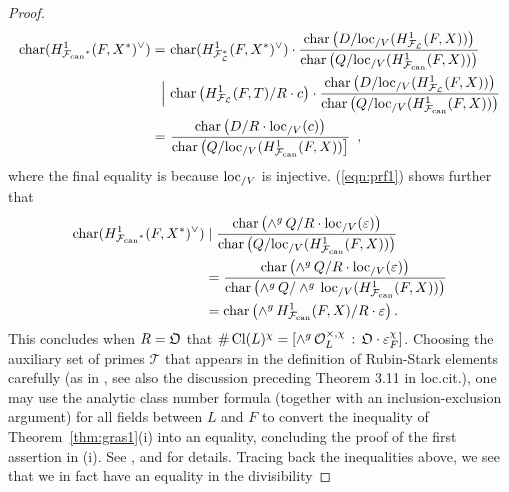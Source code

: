 \documentclass[12pt]{amsart}
\numberwithin{equation}{section}
\begin{document}
\begin{proof}
\begin{align}\notag{\textup{char}}(H^1_{{\mathcal{F}_{\textup{\lowercase{can}}}}^*}(F,X^*)^\vee)=&\,\,{\textup{char}} (H^1_{{\mathcal{F}}_{\mathcal{L}}^*}(F,X^*)^\vee)\cdot\frac{{\textup{char}}\left(D/{{\textup{loc}_{/V}}(H^1_{{\mathcal{F}}_{\mathcal{L}}}(F,X))}\right)}{{\textup{char}}\left(Q/{\textup{loc}_{/V}}(H^1_{\mathcal{F}_{\textup{\lowercase{can}}}}(F,X))\right)}\\
\label{eqn:prf3}\Big{|}& \,\,{\textup{char}}\left(H^1_{{\mathcal{F}}_{\mathcal{L}}}(F,T)/R\cdot c\right)\cdot\frac{{\textup{char}}\left(D/{{\textup{loc}_{/V}}(H^1_{{\mathcal{F}}_{\mathcal{L}}}(F,X))}\right)}{{\textup{char}}\left(Q/{\textup{loc}_{/V}}(H^1_{\mathcal{F}_{\textup{\lowercase{can}}}}(F,X))\right)}\\
\notag = &\,\,\frac{{\textup{char}}\left(D/R\cdot{\textup{loc}_{/V}}(c)\right)}{{\textup{char}}\left(Q/{\textup{loc}_{/V}}(H^1_{\mathcal{F}_{\textup{\lowercase{can}}}}(F,X))\right]} \,\,\,,
\end{align}
where the final equality is because ${\textup{loc}_{/V}}$ is injective. (\ref{eqn:prf1}) shows further that
\begin{align}
\label{eqn:usefulconversionR}
\notag{\textup{char}}(H^1_{{\mathcal{F}_{\textup{\lowercase{can}}}}^*}(F,X^*)^\vee)&\mid \frac{{\textup{char}}\left(\wedge^g\,Q/R\cdot{\textup{loc}_{/V}}(\varepsilon)\right)}{{{\textup{char}}\left(Q/{\textup{loc}_{/V}}(H^1_{\mathcal{F}_{\textup{\lowercase{can}}}}(F,X))\right)}}\\
\notag&=\frac{{\textup{char}}\left(\wedge^g\,Q/R\cdot{\textup{loc}_{/V}}(\varepsilon)\right)}{{{\textup{char}}\left(\wedge^g\,Q/\wedge^g\,{\textup{loc}_{/V}}(H^1_{\mathcal{F}_{\textup{\lowercase{can}}}}(F,X))\right)}}\\
&={\textup{char}}\left(\wedge^g\,H^1_{\mathcal{F}_{\textup{\lowercase{can}}}}(F,X)/R\cdot\varepsilon\right).
\end{align}
This concludes when $R={\frak{O}}$ that $\#\, \textup{Cl}(L)^\chi = [\wedge^g\, \mathcal{O}_{L}^{\times,\chi}\,:\,\frak{O}\cdot \varepsilon_{F}^\chi]$. Choosing the auxiliary set of primes $\mathcal{T}$ that appears in the definition of Rubin-Stark elements carefully (as in \cite[\S 2.1]{kbbstark}, see also the discussion preceding Theorem 3.11 in loc.cit.), one may use the analytic class number formula (together with an inclusion-exclusion argument) for all fields between $L$ and $F$ to convert the inequality of Theorem~\ref{thm:gras1}(i) into an equality, concluding the proof of the first assertion in (i). See \cite[\S5]{ru92}, \cite[Corollary 5.4]{ru96} and \cite[\S4.2]{popescu} for details. Tracing back the inequalities above, we see that we in fact have an equality in the divisibility 

\end{proof}
\end{document}
